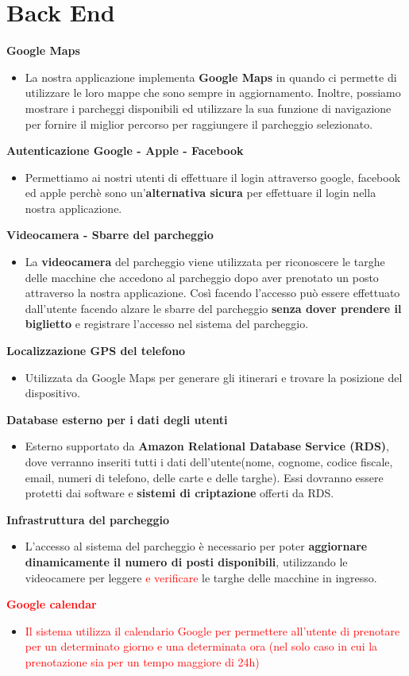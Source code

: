 \section{Back End}
\textbf{Google Maps}
\begin{itemize}
    \item La nostra applicazione implementa \textbf{Google Maps} in quando ci permette di utilizzare le loro mappe che sono sempre in aggiornamento. Inoltre, possiamo mostrare i parcheggi disponibili ed utilizzare la sua funzione di navigazione per fornire il miglior percorso per raggiungere il parcheggio selezionato.
\end{itemize}
\textbf{Autenticazione Google - Apple - Facebook}
\begin{itemize}
    \item Permettiamo ai nostri utenti di effettuare il login attraverso google, facebook ed apple perchè sono un’\textbf{alternativa sicura} per effettuare il login nella nostra applicazione.  
\end{itemize}
\textbf{Videocamera - Sbarre del parcheggio}
\begin{itemize}
    \item La \textbf{videocamera} del parcheggio viene utilizzata per riconoscere le targhe delle macchine che accedono al parcheggio dopo aver prenotato un posto attraverso la nostra applicazione. Così facendo l’accesso può essere effettuato dall’utente facendo alzare le sbarre del parcheggio \textbf{senza dover prendere il biglietto} e registrare l’accesso nel sistema del parcheggio.
\end{itemize}
\textbf{Localizzazione GPS del telefono}
\begin{itemize}
    \item Utilizzata da Google Maps per generare gli itinerari e trovare la posizione del dispositivo.
\end{itemize}
\textbf{Database esterno per i dati degli utenti}
\begin{itemize}
    \item Esterno supportato da \textbf{Amazon Relational Database Service (RDS)}, dove verranno inseriti tutti i dati dell’utente(nome, cognome, codice fiscale, email, numeri di telefono, delle carte e delle targhe). Essi dovranno essere protetti dai software e \textbf{sistemi di criptazione} offerti da RDS.
\end{itemize}
\textbf{Infrastruttura del parcheggio}
\begin{itemize}
    \item L'accesso al sistema del parcheggio è necessario per poter \textbf{aggiornare dinamicamente il numero di posti disponibili}, utilizzando le videocamere per leggere \textcolor{red}{e verificare} le targhe delle macchine in ingresso.
\end{itemize}
\textcolor{red}{\textbf{Google calendar}}
\begin{itemize}
    \item \textcolor{red}{Il sistema utilizza il calendario Google per permettere all'utente di prenotare per un determinato giorno e una determinata ora (nel solo caso in cui la prenotazione sia per un tempo maggiore di 24h)}
\end{itemize}